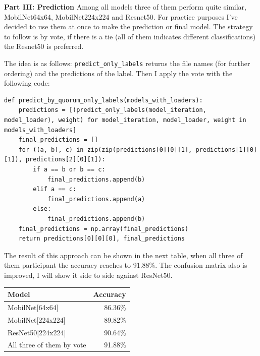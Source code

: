 \documentclass{cpsc202}
\begin{document}
    \large\textbf{Part III: Prediction}
    Among all models three of them perform quite similar, MobilNet64x64, MobilNet224x224 and Resnet50.
    For practice purposes I've decided to use them at once to make the prediction or final model.
    The strategy to follow is by vote, if there is a tie (all of them indicates different classifications) the Resnet50 is preferred.

    The idea is as follows: \lstinline|predict_only_labels| returns the file names (for further ordering) and the predictions of the label.
    Then I apply the vote with the following code:
    \begin{lstlisting}
def predict_by_quorum_only_labels(models_with_loaders):
    predictions = [(predict_only_labels(model_iteration, model_loader), weight) for model_iteration, model_loader, weight in models_with_loaders]
    final_predictions = []
    for ((a, b), c) in zip(zip(predictions[0][0][1], predictions[1][0][1]), predictions[2][0][1]):
        if a == b or b == c:
            final_predictions.append(b)
        elif a == c:
            final_predictions.append(a)
        else:
            final_predictions.append(b)
    final_predictions = np.array(final_predictions)
    return predictions[0][0][0], final_predictions

    \end{lstlisting}

    The result of this approach can be shown in the next table, when all three of them participant the accuracy reaches to 91.88\%.
    The confusion matrix also is improved, I will show it side to side against ResNet50. \\

    \begin{center}

\begin{tabular}{||l | r||}
 \hline
 Model & Accuracy \\ [0.5ex]
 \hline\hline
 MobilNet[64x64] & 86.36\% \\ \hline
 MobilNet[224x224] & 89.82\% \\ \hline
 ResNet50[224x224] & 90.64\% \\
 \hline \hline
 All three of them by vote & 91.88\% \\ [1ex]
 \hline
\end{tabular}
\end{center}
\end{document}
